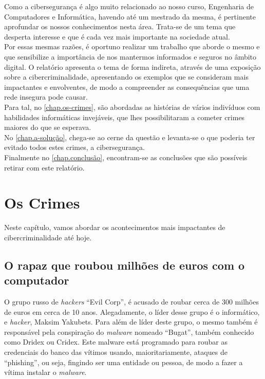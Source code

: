 \documentclass{report}
\begin{document}
Como a cibersegurança é algo muito relacionado ao nosso curso, Engenharia de Computadores e Informática, havendo até um mestrado da mesma, é pertinente aprofundar os nossos conhecimentos nesta área. Trata-se de um tema que desperta interesse e que é cada vez mais importante na sociedade atual. \\ \indent Por essas mesmas razões, é oportuno realizar um trabalho que aborde o mesmo e que sensibilize a importância de nos mantermos informados e seguros no âmbito digital. O relatório apresenta o tema de forma indireta, através de uma exposição sobre a cibercriminalidade, apresentando os exemplos que se consideram mais impactantes e envolventes, de modo a compreender as consequências que uma rede insegura pode causar. \\ \indent Para tal, no \autoref{chap.os-crimes}, são abordadas as histórias de vários indivíduos com habilidades informáticas invejáveis, que lhes possibilitaram a cometer crimes maiores do que se esperava. \\ \indent No \autoref{chap.a-solução}, chega-se ao cerne da questão e levanta-se o que poderia ter evitado todos estes crimes, a cibersegurança. \\ \indent Finalmente no \autoref{chap.conclusão}, encontram-se as conclusões que são possíveis retirar com este relatório.

\chapter{Os Crimes}
\label{chap.os-crimes}
Neste capítulo, vamos abordar os acontecimentos mais impactantes de cibercriminalidade até hoje.
\section{O rapaz que roubou milhões de euros com o computador}

O grupo russo de \textit{hackers} “Evil Corp”, é acusado de roubar cerca de 300 milhões de euros em cerca de 10 anos. Alegadamente, o líder desse grupo é o informático, e \textit{hacker}, Maksim Yakubets. Para além de líder deste grupo, o mesmo também é responsável pela conspiração do \textit{malware} nomeado “Bugat”, também conhecido como Dridex ou Cridex. Este malware está programado para roubar as credenciais do banco das vítimos usando, maioritariamente, ataques de “phishing”, ou seja, fingindo ser uma entidade ou pessoa, de modo a fazer a vítima instalar o \textit{malware}. \\ \indent 
\end{document}
